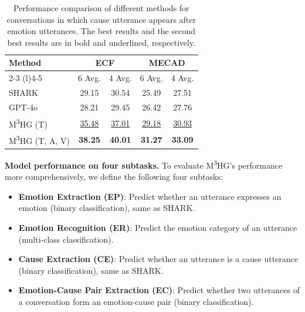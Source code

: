 \documentclass[11pt]{article}
\begin{document}
\begin{table}
  \centering
  \renewcommand{\arraystretch}{1.05}
  \caption{Performance comparison of different methods for conversations in which cause utterance appears after emotion utterances. The best results and the second best results are in bold and underlined, respectively.}
  \label{tab:cause appears after emotion}
  \small  %
  {%
  \begin{tabular}{lcccc}
  \toprule
  \multirow{3}{*}{Method} & \multicolumn{2}{c}{\textbf{ECF}} & \multicolumn{2}{c}{\textbf{MECAD}} \\ \cmidrule(l){2-3} \cmidrule(l){4-5} 
   & 6 Avg. & 4 Avg. & 6 Avg. & 4 Avg.  \\ 
   \midrule
  SHARK & 29.15 & 30.54 & 25.49 & 27.51 \\
  GPT-4o & 28.21 & 29.45 & 26.42 & 27.76 \\
  M\textsuperscript{3}HG (T) & \underline{35.48} & \underline{37.01} & \underline{29.18} & \underline{30.93} \\
M\textsuperscript{3}HG (T, A, V) & \textbf{38.25} & \textbf{40.01} & \textbf{31.27} & \textbf{33.09} \\
  \bottomrule
  \end{tabular}%
  }
\end{table}

\noindent \textbf{Model performance on four subtasks.}
To evaluate M\textsuperscript{3}HG’s performance more comprehensively, we define the following four subtasks:
\begin{itemize}[itemsep=0pt,parsep=0pt,topsep=0pt,partopsep=0pt]
  \item \textbf{Emotion Extraction (EP)}: Predict whether an utterance expresses an emotion (binary classification), same as SHARK.
  \item \textbf{Emotion Recognition (ER)}: Predict the emotion category of an utterance (multi-class classification).
  \item \textbf{Cause Extraction (CE)}: Predict whether an utterance is a cause utterance (binary classification), same as SHARK.
  \item \textbf{Emotion-Cause Pair Extraction (EC)}: Predict whether two utterances of a conversation form an emotion-cause pair (binary classification).
\end{itemize}
\end{document}

